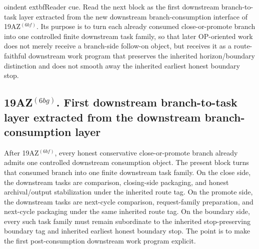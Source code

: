 oindent	extbf{Reader cue.} Read the next block as the first downstream branch-to-task layer extracted from the new downstream branch-consumption interface of 19AZ$^{(6bf)}$. Its purpose is to turn each already consumed close-or-promote branch into one controlled finite downstream task family, so that later OP-oriented work does not merely receive a branch-side follow-on object, but receives it as a route-faithful downstream work program that preserves the inherited horizon/boundary distinction and does not smooth away the inherited earliest honest boundary stop.

\subsection*{19AZ$^{(6bg)}$. First downstream branch-to-task layer extracted from the downstream branch-consumption layer}
\label{sec:first-downstream-branch-to-task-layer-extracted-from-the-downstream-branch-consumption-layer}
After 19AZ$^{(6bf)}$, every honest conservative close-or-promote branch already admits one controlled downstream consumption object. The present block turns that consumed branch into one finite downstream task family. On the close side, the downstream tasks are comparison, closing-side packaging, and honest archival/output stabilization under the inherited route tag. On the promote side, the downstream tasks are next-cycle comparison, request-family preparation, and next-cycle packaging under the same inherited route tag. On the boundary side, every such task family must remain subordinate to the inherited stop-preserving boundary tag and inherited earliest honest boundary stop. The point is to make the first post-consumption downstream work program explicit.

